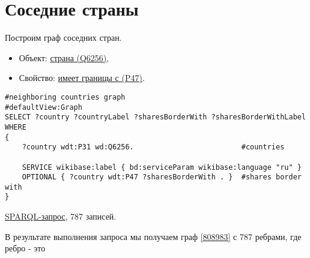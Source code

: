 \section{Соседние страны}

Построим граф соседних стран.

\begin{itemize}
    \item Объект: \href{https://www.wikidata.org/wiki/Q6256}{страна (Q6256)},
    \item Свойство: \href{https://www.wikidata.org/wiki/Property:P47}{имеет границы с (P47)}.
\end{itemize}

\begin{lstlisting}[language=SPARQL]
#neighboring countries graph
#defaultView:Graph
SELECT ?country ?countryLabel ?sharesBorderWith ?sharesBorderWithLabel
WHERE
{
    ?country wdt:P31 wd:Q6256.                         #countries

    SERVICE wikibase:label { bd:serviceParam wikibase:language "ru" }
    OPTIONAL { ?country wdt:P47 ?sharesBorderWith . }  #shares border with
}
\end{lstlisting}

\href{https://query.wikidata.org/#%23neighboring%20countries%20graph%0A%23defaultView%3AGraph%0ASELECT%20%3Fcountry%20%3FcountryLabel%20%3FsharesBorderWith%20%3FsharesBorderWithLabel%0AWHERE%0A%7B%0A%20%20%20%20%3Fcountry%20wdt%3AP31%20wd%3AQ6256.%0A%0A%20%20%20%20SERVICE%20wikibase%3Alabel%20%7B%20bd%3AserviceParam%20wikibase%3Alanguage%20%22ru%22%20%7D%0A%20%20%20%20OPTIONAL%20%7B%20%3Fcountry%20wdt%3AP47%20%3FsharesBorderWith%20.%20%7D%0A%0A%7D%0A}{SPARQL-запрос}, 787 записей.

В результате выполнения запроса мы получаем граф \ref{808983} с 787 ребрами, где ребро - это 

